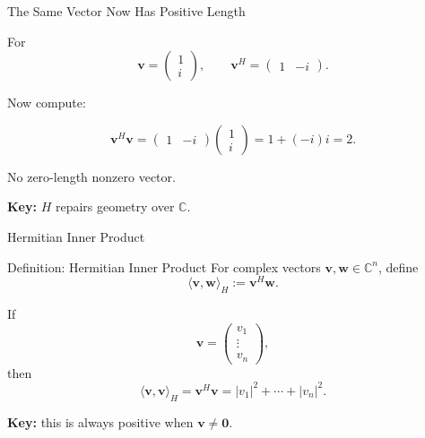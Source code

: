 \documentclass[10pt]{beamer}
\theoremstyle{definition}
\newcommand{\x}[1]{\alert{\textbf{#1}}}
\begin{document}
\begin{frame}{The Same Vector Now Has Positive Length}

For
$$
\mathbf{v}=\begin{pmatrix}1\\ i\end{pmatrix},
\qquad
\mathbf{v}^H=\begin{pmatrix}1&-i\end{pmatrix}.
$$

\vfill

Now compute:

$$
\mathbf{v}^H\mathbf{v}
=\begin{pmatrix}1&-i\end{pmatrix}
\begin{pmatrix}1\\ i\end{pmatrix}
=1+(-i)i
=2.
$$

\vfill\pause

No zero-length nonzero vector.

\vfill

\x{Key:} $H$ repairs geometry over $\mathbb{C}$.

\end{frame}


\begin{frame}{Hermitian Inner Product}

\begin{block}{Definition: Hermitian Inner Product}
For complex vectors $\mathbf{v},\mathbf{w}\in\mathbb{C}^n$, define
$$
\langle \mathbf{v},\mathbf{w}\rangle_H
:=\mathbf{v}^H\mathbf{w}.
$$
\end{block}

\vfill

If
$$
\mathbf{v}=\begin{pmatrix}v_1\\ \vdots \\ v_n\end{pmatrix},
$$
then
$$
\langle \mathbf{v},\mathbf{v}\rangle_H
=\mathbf{v}^H\mathbf{v}
=|v_1|^2+\cdots+|v_n|^2.
$$

\vfill

\x{Key:} this is always positive when $\mathbf{v}\ne\mathbf{0}$.

\end{frame}
\end{document}
